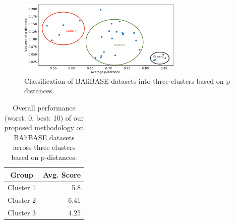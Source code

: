 \begin{figure}[!htbp] 
	\centering
	\includegraphics[width=0.7\textwidth]{Figure/balibase_cluster}
	\caption{Classification of BAliBASE datasets into three clusters based on p-distances.} 
	\label{fig:balibase_cluster}
\end{figure}

\begin{table}[htbp]
	\centering
	\caption{Overall performance (worst: 0, best: 10) of our proposed methodology on BAliBASE datasets across three clusters based on p-distances.}
	\begin{tabular}{|c|r|}
		\hline
		Group & \multicolumn{1}{l|}{Avg. Score} \\
		\hline
		Cluster 1 & 5.8 \\
		\hline
		Cluster 2 & 6.41 \\
		\hline
		Cluster 3 & 4.25 \\
		\hline
	\end{tabular}%
	\label{tab:cluster}%
\end{table}%


